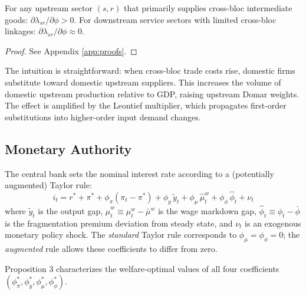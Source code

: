 \begin{lemma}
  \label{lemma:domar}
  For any upstream sector $(s,r)$ that primarily supplies cross-bloc
  intermediate goods: $\partial\lambda_{sr}/\partial\phi > 0$.
  For downstream service sectors with limited cross-bloc linkages:
  $\partial\lambda_{sr}/\partial\phi \approx 0$.
\end{lemma}

\begin{proof}
  See Appendix \ref{app:proofs}.
\end{proof}

The intuition is straightforward: when cross-bloc trade costs rise, domestic
firms substitute toward domestic upstream suppliers. This increases the volume
of domestic upstream production relative to GDP, raising upstream Domar
weights. The effect is amplified by the Leontief multiplier, which propagates
first-order substitutions into higher-order input demand changes.

\subsection{Monetary Authority}
\label{sec:monetary}

The central bank sets the nominal interest rate according to a (potentially
augmented) Taylor rule:
\begin{equation}
  i_t = r^* + \pi^* + \phi_\pi(\pi_t - \pi^*) + \phi_y\,\tilde{y}_t
        + \phi_\mu\,\hat\mu_t^w + \phi_\phi\,\hat\phi_t + \nu_t
  \label{eq:taylor}
\end{equation}
where $\tilde{y}_t$ is the output gap, $\hat\mu_t^w \equiv \mu_t^w - \bar\mu^w$
is the wage markdown gap, $\hat\phi_t \equiv \phi_t - \bar\phi$ is the
fragmentation premium deviation from steady state, and $\nu_t$ is an
exogenous monetary policy shock. The \emph{standard} Taylor rule corresponds
to $\phi_\mu = \phi_\phi = 0$; the \emph{augmented} rule allows these
coefficients to differ from zero.

Proposition 3 characterizes the welfare-optimal values of all four
coefficients $(\phi_\pi^*, \phi_y^*, \phi_\mu^*, \phi_\phi^*)$.
